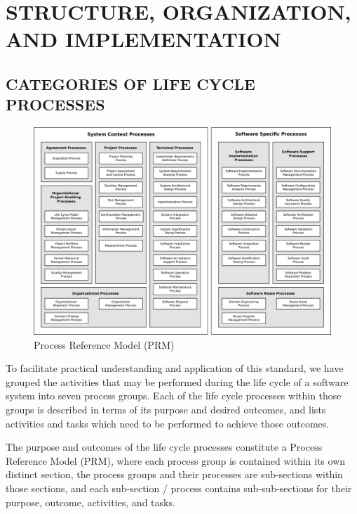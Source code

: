 \section{STRUCTURE, ORGANIZATION, AND IMPLEMENTATION}

	\subsection{CATEGORIES OF LIFE CYCLE PROCESSES}

	\begin{figure}[h]
		\centering
		\includegraphics[width=17cm,keepaspectratio]{figures/life-cycle-process-groups.pdf}
		\caption{Process Reference Model (PRM)}
		\label{fig:life_cycle_process_groups}
	\end{figure}

	\begin{adjustwidth}{0.5em}{0pt}

		To facilitate practical understanding and application of this standard, we have grouped the activities that may be performed during the life cycle of a software system into seven process groups. Each of the life cycle processes within those groups is described in terms of its purpose and desired outcomes, and lists activities and tasks which need to be performed to achieve those outcomes.

		The purpose and outcomes of the life cycle processes constitute a Process Reference Model (PRM), where each process group is contained within its own distinct section, the process groups and their processes are sub-sections within those sections, and each sub-section / process contains sub-sub-sections for their purpose, outcome, activities, and tasks. 

	\end{adjustwidth}

